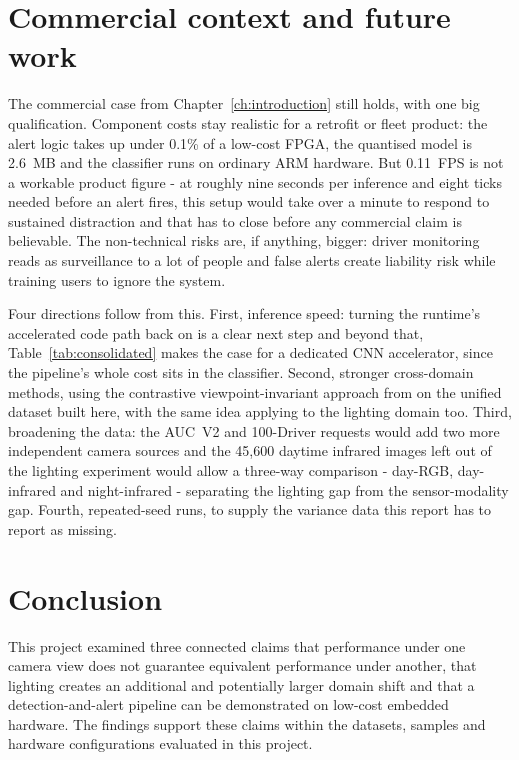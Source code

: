 \section{Commercial context and future work}
\label{sec:eval-future}

The commercial case from Chapter~\ref{ch:introduction} still holds, with one big qualification. Component costs stay realistic for a retrofit or fleet product: the alert logic takes up under 0.1\% of a low-cost FPGA, the quantised model is 2.6~MB and the classifier runs on ordinary ARM hardware. But 0.11~FPS is not a workable product figure - at roughly nine seconds per inference and eight ticks needed before an alert fires, this setup would take over a minute to respond to sustained distraction and that has to close before any commercial claim is believable. The non-technical risks are, if anything, bigger: driver monitoring reads as surveillance to a lot of people and false alerts create liability risk while training users to ignore the system.

Four directions follow from this. First, inference speed: turning the runtime's accelerated code path back on is a clear next step and beyond that, Table~\ref{tab:consolidated} makes the case for a dedicated CNN accelerator, since the pipeline's whole cost sits in the classifier. Second, stronger cross-domain methods, using the contrastive viewpoint-invariant approach from \citet{bhalla2025crossview} on the unified dataset built here, with the same idea applying to the lighting domain too. Third, broadening the data: the AUC~V2 and 100-Driver requests would add two more independent camera sources and the 45,600 daytime infrared images left out of the lighting experiment would allow a three-way comparison - day-RGB, day-infrared and night-infrared - separating the lighting gap from the sensor-modality gap. Fourth, repeated-seed runs, to supply the variance data this report has to report as missing.

\section{Conclusion}

This project examined three connected claims that performance under one camera view does not guarantee equivalent performance under another, that lighting creates an additional and potentially larger domain shift and that a detection-and-alert pipeline can be demonstrated on low-cost embedded hardware. The findings support these claims within the datasets, samples and hardware configurations evaluated in this project.

